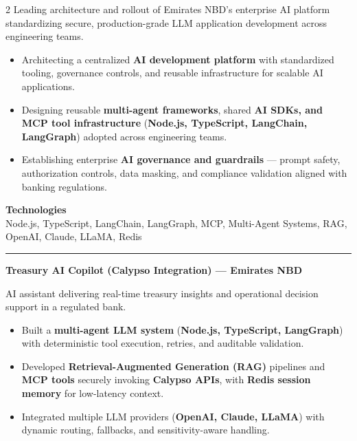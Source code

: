 \documentclass[10pt,a4paper]{article}
\newcommand{\blockdivider}{\vspace{0pt}\color{rulecolor}\rule{\linewidth}{0.5pt}\color{primary}\vspace{4pt}}
\newcommand{\projecttitle}[1]{\textbf{#1}\par\vspace{2pt}}
\begin{document}
\begin{paracol}{2}
Leading architecture and rollout of Emirates NBD's enterprise AI platform standardizing secure, production-grade LLM application development across engineering teams.

\begin{itemize}

\item Architecting a centralized \textbf{AI development platform} with standardized tooling, governance controls, and reusable infrastructure for scalable AI applications.

\item Designing reusable \textbf{multi-agent frameworks}, shared \textbf{AI SDKs, and MCP tool infrastructure} (\textbf{Node.js, TypeScript, LangChain, LangGraph}) adopted across engineering teams.

\item Establishing enterprise \textbf{AI governance and guardrails} — prompt safety, authorization controls, data masking, and compliance validation aligned with banking regulations.

\end{itemize}

\textbf{Technologies}\\
Node.js, TypeScript, LangChain, LangGraph, MCP, Multi-Agent Systems, RAG, OpenAI, Claude, LLaMA, Redis

\blockdivider

\projecttitle{Treasury AI Copilot (Calypso Integration) — Emirates NBD}

AI assistant delivering real-time treasury insights and operational decision support in a regulated bank.

\begin{itemize}

\item Built a \textbf{multi-agent LLM system} (\textbf{Node.js, TypeScript, LangGraph}) with deterministic tool execution, retries, and auditable validation.

\item Developed \textbf{Retrieval-Augmented Generation (RAG)} pipelines and \textbf{MCP tools} securely invoking \textbf{Calypso APIs}, with \textbf{Redis session memory} for low-latency context.

\item Integrated multiple LLM providers (\textbf{OpenAI, Claude, LLaMA}) with dynamic routing, fallbacks, and sensitivity-aware handling.

\end{itemize}


\end{paracol}
\end{document}
